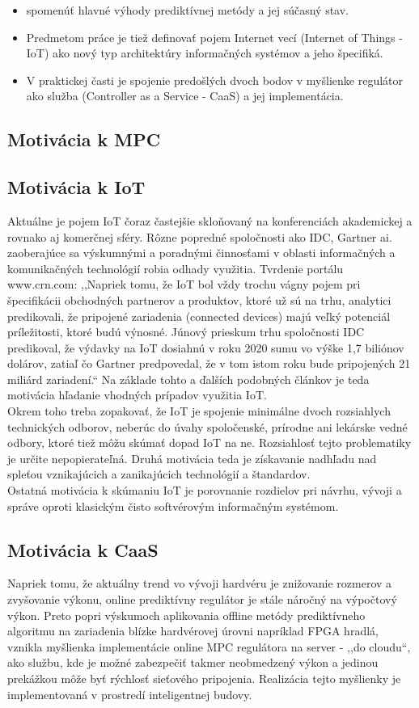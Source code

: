 \indent 
\begin{itemize}
\item  spomenúť hlavné výhody prediktívnej metódy a jej súčasný stav.
\item  Predmetom práce je tiež definovať pojem Internet vecí (Internet of Things - IoT) ako nový typ architektúry informačných systémov a jeho špecifiká. 
\item  V praktickej časti je spojenie predošlých dvoch bodov v myšlienke regulátor ako služba (Controller as a Service - CaaS) a jej implementácia. 
\end{itemize}
 
\subsection*{Motivácia k MPC}

\subsection*{Motivácia k IoT}
Aktuálne je pojem IoT čoraz častejšie skloňovaný na konferenciách akademickej a rovnako aj komerčnej sféry. Rôzne popredné spoločnosti ako IDC, Gartner ai. zaoberajúce sa výskumnými a poradnými činnosťami v oblasti informačných a komunikačných technológií robia odhady využitia. Tvrdenie portálu www.crn.com:
,,Napriek tomu, že IoT bol vždy trochu vágny pojem pri špecifikácii obchodných partnerov a produktov, ktoré už sú na trhu, analytici predikovali, že pripojené zariadenia (connected devices) majú veľký potenciál príležitosti, ktoré budú výnosné. Júnový prieskum trhu spoločnosti IDC predikoval, že výdavky na IoT dosiahnú v roku 2020 sumu vo výške 1,7 biliónov dolárov, zatiaľ čo Gartner predpovedal, že v tom istom roku bude pripojených 21 miliárd zariadení.``\cite{IOT01} Na základe tohto a ďalších podobných článkov je teda motivácia hľadanie vhodných prípadov využitia IoT.\\
\indent Okrem toho treba zopakovať, že IoT je spojenie minimálne dvoch rozsiahlych technických odborov, neberúc do úvahy spoločenské, prírodne ani lekárske vedné odbory, ktoré tiež môžu skúmať dopad IoT na ne. Rozsiahlosť tejto problematiky je určite nepopierateľná. Druhá motivácia teda je získavanie  nadhľadu nad spleťou vznikajúcich a zanikajúcich technológií a štandardov.\\
\indent Ostatná motivácia k skúmaniu IoT je porovnanie rozdielov pri návrhu, vývoji a správe oproti klasickým čisto softvérovým informačným systémom. 
\subsection*{Motivácia k CaaS}
Napriek tomu, že aktuálny trend vo vývoji hardvéru je znižovanie rozmerov a  zvyšovanie výkonu, online prediktívny regulátor je stále náročný na výpočtový výkon. Preto popri výskumoch aplikovania offline metódy prediktívneho algoritmu na zariadenia blízke hardvérovej úrovni napríklad FPGA hradlá, vznikla myšlienka implementácie online MPC regulátora na server - ,,do cloudu``, ako službu, kde je možné zabezpečiť takmer neobmedzený výkon a jedinou prekážkou môže byť rýchlosť sieťového pripojenia. Realizácia tejto myšlienky je implementovaná v prostredí inteligentnej budovy.